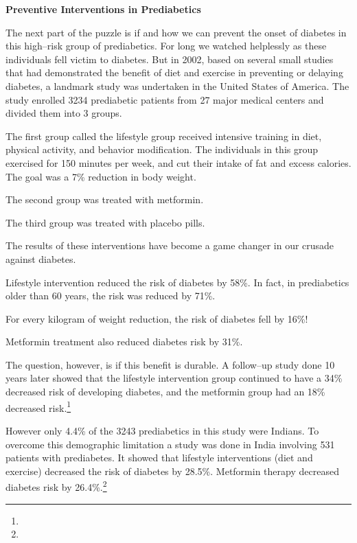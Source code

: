 \textbf{Preventive Interventions in Prediabetics}

The next part of the puzzle is if and how we can prevent the onset of diabetes in this high–risk group of prediabetics. For long we watched helplessly as these individuals fell victim to diabetes. But in 2002, based on several small studies that had demonstrated the benefit of diet and exercise in preventing or delaying diabetes, a landmark study was undertaken in the United States of America. The study enrolled 3234 prediabetic patients from 27 major medical centers and divided them into 3 groups.

\item The first group called the lifestyle group received intensive training in diet, physical activity, and behavior modification. The individuals in this group exercised for 150 minutes per week, and cut their intake of fat and excess calories. The goal was a 7\% reduction in body weight.

 \item The second group was treated with metformin.

 \item The third group was treated with placebo pills.

The results of these interventions have become a game changer in our crusade against diabetes.

\item Lifestyle intervention reduced the risk of diabetes by 58\%. In fact, in prediabetics older than 60 years, the risk was reduced by 71\%.

 \item For every kilogram of weight reduction, the risk of diabetes fell by 16\%!

 \item Metformin treatment also reduced diabetes risk by 31\%.

The question, however, is if this benefit is durable. A follow–up study done 10 years later showed that the lifestyle intervention group continued to have a 34\% decreased risk of developing diabetes, and the metformin group had an 18\% decreased risk.\footnote{}

However only 4.4\% of the 3243 prediabetics in this study were Indians. To overcome this demographic limitation a study was done in India involving 531 patients with prediabetes. It showed that lifestyle interventions (diet and exercise) decreased the risk of diabetes by 28.5\%. Metformin therapy decreased diabetes risk by 26.4\%.\footnote{}

